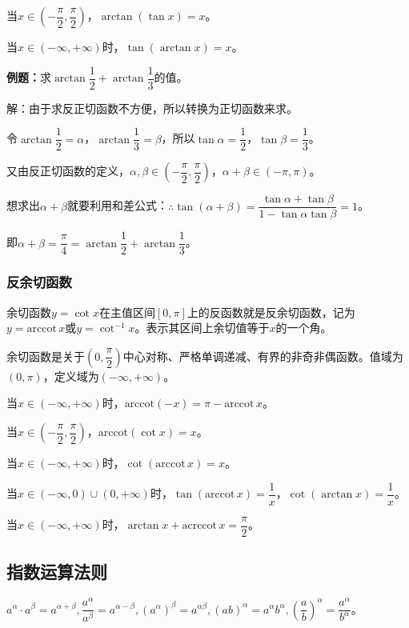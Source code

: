 \documentclass[UTF8, 12pt]{ctexart}
\begin{document}
当$x\in\left(-\dfrac{\pi}{2},\dfrac{\pi}{2}\right)$，$\arctan(\tan x)=x$。

当$x\in(-\infty,+\infty)$时，$\tan(\arctan x)=x$。

\textbf{例题：}求$\arctan\dfrac{1}{2}+\arctan\dfrac{1}{3}$的值。

解：由于求反正切函数不方便，所以转换为正切函数来求。

令$\arctan\dfrac{1}{2}=\alpha$，$\arctan\dfrac{1}{3}=\beta$，所以$\tan\alpha=\dfrac{1}{2}$，$\tan\beta=\dfrac{1}{3}$。

又由反正切函数的定义，$\alpha,\beta\in\left(-\dfrac{\pi}{2},\dfrac{\pi}{2}\right)$，$\alpha+\beta\in(-\pi,\pi)$。

想求出$\alpha+\beta$就要利用和差公式：$\therefore\tan(\alpha+\beta)=\dfrac{\tan\alpha+\tan\beta}{1-\tan\alpha\tan\beta}=1$。

即$\alpha+\beta=\dfrac{\pi}{4}=\arctan\dfrac{1}{2}+\arctan\dfrac{1}{3}$。

\subsubsection{反余切函数}

余切函数$y=\cot x$在主值区间$[0,\pi]$上的反函数就是反余切函数，记为$y=\textrm{arccot}\,x$或$y=\cot^{-1}x$。表示其区间上余切值等于$x$的一个角。

余切函数是关于$\left(0,\dfrac{\pi}{2}\right)$中心对称、严格单调递减、有界的非奇非偶函数。值域为$(0,\pi)$，定义域为$(-\infty,+\infty)$。

当$x\in(-\infty,+\infty)$时，$\textrm{arccot}(-x)=\pi-\textrm{arccot}\,x$。

当$x\in\left(-\dfrac{\pi}{2},\dfrac{\pi}{2}\right)$，$\textrm{arccot}(\cot x)=x$。

当$x\in(-\infty,+\infty)$时，$\cot(\textrm{arccot}\,x)=x$。

当$x\in(-\infty,0)\cup(0,+\infty)$时，$\tan(\textrm{arccot}\,x)=\dfrac{1}{x}$，$\cot(\arctan x)=\dfrac{1}{x}$。

当$x\in(-\infty,+\infty)$时，$\arctan x+\textrm{acrccot}\,x=\dfrac{\pi}{2}$。

\subsection{指数运算法则}

$a^\alpha\cdot a^\beta=a^{\alpha+\beta},\dfrac{a^\alpha}{a^\beta}=a^{\alpha-\beta},(a^\alpha)^\beta=a^{\alpha\beta},(ab)^\alpha=a^\alpha b^\alpha,(\dfrac{a}{b})^\alpha=\dfrac{a^\alpha}{b^\alpha}$。
\end{document}
